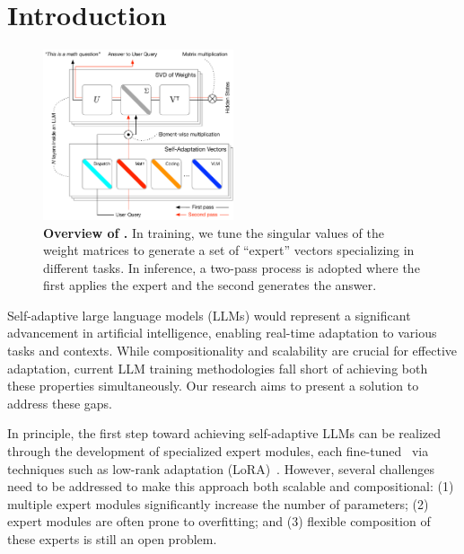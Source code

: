 \section{Introduction}
\label{sec:introduction}

\begin{figure}
\vspace{-6mm}
\begin{center}
    \includegraphics[width=0.5\textwidth]{images/cover.pdf}
  \end{center}
  \vspace{-4mm}
  \caption{\textbf{Overview of \implname.} In training, we tune the singular values of the weight matrices to generate a set of ``expert'' vectors specializing in different tasks. In inference, a two-pass process is adopted where the first applies the expert and the second generates the answer.}
  \label{fig:cover}
  \vspace{-4mm}
\end{figure}

Self-adaptive large language models (LLMs) would represent a significant advancement in artificial intelligence, enabling real-time adaptation to various tasks and contexts.
While compositionality and scalability are crucial for effective adaptation, current LLM training methodologies fall short of achieving both these properties simultaneously.
Our research aims to present a solution to address these gaps.

In principle, the first step toward achieving self-adaptive LLMs can be realized through the development of specialized expert modules, each fine-tuned~\citep{kaplan2020scaling} via techniques such as low-rank adaptation (LoRA)~\citep{hu2021lora}. 
However, several challenges need to be addressed to make this approach both scalable and compositional: (1) multiple expert modules significantly increase the number of parameters; (2) expert modules are often prone to overfitting; and (3) flexible composition of these experts is still an open problem.

